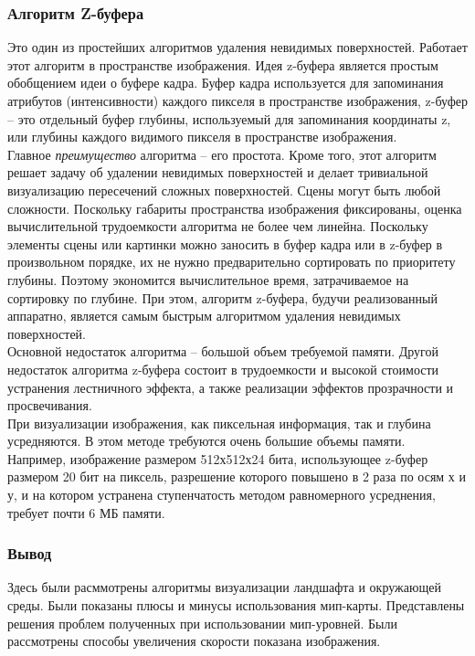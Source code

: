 \documentclass[a4paper, 10pt]{article}
\begin{document}
	 \subsubsection{Алгоритм Z-буфера}
	 \hspace*{5mm}Это один из простейших алгоритмов удаления невидимых поверхностей. Работает этот алгоритм в пространстве изображения. Идея z-буфера является простым обобщением идеи о буфере кадра. Буфер кадра используется для запоминания атрибутов (интенсивности) каждого пикселя в пространстве изображения, z-буфер – это отдельный буфер глубины, используемый для запоминания координаты z, или глубины каждого видимого пикселя в пространстве изображения.\cite{zbuff}
	 \\ \hspace*{5mm} Главное \textit{преимущество} алгоритма – его простота. Кроме того, этот алгоритм решает задачу об удалении невидимых поверхностей и делает тривиальной визуализацию пересечений сложных поверхностей. Сцены могут быть любой сложности. Поскольку габариты пространства изображения фиксированы, оценка вычислительной трудоемкости алгоритма не более чем линейна. Поскольку элементы сцены или картинки можно заносить в буфер кадра или в z-буфер в произвольном порядке, их не нужно предварительно сортировать по приоритету глубины. Поэтому экономится вычислительное время, затрачиваемое на сортировку по глубине. При этом, алгоритм z-буфера, будучи реализованный аппаратно, является самым быстрым алгоритмом удаления невидимых поверхностей.
	 \\ \hspace*{5mm} Основной недостаток алгоритма – большой объем требуемой памяти. Другой недостаток алгоритма z-буфера состоит в трудоемкости и высокой стоимости устранения лестничного эффекта, а также реализации эффектов прозрачности и просвечивания. 
	 \\ \hspace*{5mm} При визуализации изображения, как пиксельная информация, так и глубина усредняются. В этом методе требуются очень большие объемы памяти. Например, изображение размером 512х512х24 бита, использующее z-буфер размером 20 бит на пиксель, разрешение которого повышено в 2 раза по осям х и у, и на котором устранена ступенчатость методом равномерного усреднения, требует почти 6 МБ памяти.
	 \subsubsection{Вывод}
	 \hspace*{5mm} Здесь были расммотрены алгоритмы визуализации ландшафта и окружающей среды. Были показаны плюсы и минусы использования мип-карты. Представлены решения проблем полученных при использовании мип-уровней. Были рассмотрены способы увеличения скорости показана изображения.
\end{document}
